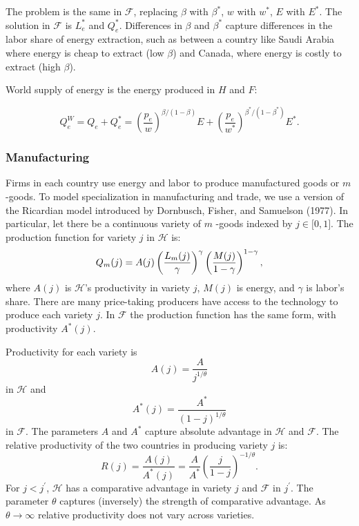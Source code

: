 \documentclass[notitlepage,12pt]{article}
\begin{document}
The problem is the same in $\mathcal{F}$, replacing $\beta $ with $\beta
^{\ast }$, $w$ with $w^{\ast }$, $E$ with $E^{\ast }$. The solution in $%
\mathcal{F}$ is $L_{e}^{\ast }$ and $Q_{e}^{\ast }$. Differences in $\beta $
and $\beta ^{\ast }$ capture differences in the labor share of energy
extraction, such as between a country like Saudi Arabia where energy is
cheap to extract (low $\beta $) and Canada, where energy is costly to
extract (high $\beta $).

World supply of energy is the energy produced in $H$ and $F$:

\begin{equation*}
Q_{e}^{W}=Q_{e}+Q_{e}^{\ast }=\left( \frac{p_{e}}{w}\right) ^{\beta
/(1-\beta )}E+\left( \frac{p_{e}}{w^{\ast }}\right) ^{\beta ^{\ast
}/(1-\beta ^{\ast })}E^{\ast }.
\end{equation*}

\subsubsection{Manufacturing}

Firms in each country use energy and labor to produce manufactured goods or $%
m$-goods. To model specialization in manufacturing and trade, we use a
version of the Ricardian model introduced by Dornbusch, Fisher, and
Samuelson (1977). In particular, let there be a continuous variety of $m$%
-goods indexed by $j\in \lbrack 0,1]$. The production function for variety $%
j $ in $\mathcal{H}$ is:%
\begin{equation*}
Q_{m}(j)=A(j)\left( \frac{L_{m}(j)}{\gamma }\right) ^{\gamma }\left( \frac{%
M(j)}{1-\gamma }\right) ^{1-\gamma },
\end{equation*}%
where $A(j)$ is $\mathcal{H}$'s productivity in variety $j$, $M\left(
j\right) $ is energy, and $\gamma $ is labor's share. There are many
price-taking producers have access to the technology to produce each variety 
$j$. In $\mathcal{F}$ the production function has the same form, with
productivity $A^{\ast }(j)$.

Productivity for each variety is%
\begin{equation*}
A(j)=\frac{A}{j^{1/\theta }}
\end{equation*}%
in $\mathcal{H}$ and%
\begin{equation*}
A^{\ast }(j)=\frac{A^{\ast }}{\left( 1-j\right) ^{1/\theta }}
\end{equation*}%
in $\mathcal{F}$. The parameters $A$ and $A^{\ast }$ capture absolute
advantage in $\mathcal{H}$ and $\mathcal{F}$. The relative productivity of
the two countries in producing variety $j$ is:%
\begin{equation}
R(j)=\frac{A(j)}{A^{\ast }(j)}=\frac{A}{A^{\ast }}\left( \frac{j}{1-j}%
\right) ^{-1/\theta }.  \label{relative productivity}
\end{equation}%
For $j<j^{\prime }$, $\mathcal{H}$ has a comparative advantage in variety $j$
and $\mathcal{F}$ in $j^{\prime }$. The parameter $\theta $ captures
(inversely) the strength of comparative advantage. As $\theta \rightarrow
\infty $ relative productivity does not vary across varieties.
\end{document}
